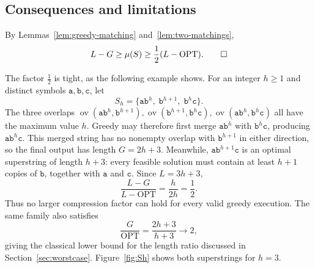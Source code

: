 \documentclass[11pt,a4paper]{article}   %
\makeatletter
\renewenvironment{proof}[1][\proofname]{\par
  \pushQED{\qed}%
  \normalfont \topsep1\p@\@plus1\p@\relax
  \trivlist
  \item[\hskip\labelsep\itshape #1\@addpunct{.}]\ignorespaces
}{\popQED\endtrivlist\@endpefalse}
\theoremstyle{compact}
\theoremstyle{compactdef}
\newcommand{\OPT}{\mathrm{OPT}}
\newcommand{\GR}{G}                         %
\newcommand{\ov}{\operatorname{ov}}         %
\newcommand{\str}[1]{\texttt{#1}}           %
\makeatother
\begin{document}
\subsection{Consequences and limitations}

\begin{proof}[Proof of Theorem~\ref{thm:half}]
By Lemmas~\ref{lem:greedy-matching} and~\ref{lem:two-matchings}, 
\[L-\GR\ge\mu(S)\ge\frac12(L-\OPT).\qedhere\]
\end{proof}


The factor $\frac12$ is tight, as the following example shows. For an integer $h\ge1$ and
distinct symbols $\str{a},\str{b},\str{c}$, let
\[
S_h=\{\str{a}\str{b}^h,\;\str{b}^{h+1},\;
       \str{b}^h\str{c}\}.
\]
The three overlaps $\ov(\str{a}\str{b}^h,\str{b}^{h+1}),
\ov(\str{b}^{h+1},\str{b}^h\str{c}),
\ov(\str{a}\str{b}^h,\str{b}^h\str{c})$
all have the maximum value $h$. Greedy may therefore first merge
$\str{a}\str{b}^h$ with $\str{b}^h\str{c}$, producing
$\str{a}\str{b}^h\str{c}$. This merged string has no nonempty
overlap with $\str{b}^{h+1}$ in either direction, so the final
output has length $\GR=2h+3$. Meanwhile, $\str{a}\str{b}^{h+1}\str{c}$ is an optimal
superstring of length $h+3$: every feasible solution must contain
at least $h+1$ copies of $\str{b}$, together with $\str{a}$ and
$\str{c}$. Since $L=3h+3$,
\[
\frac{L-\GR}{L-\OPT}=\frac{h}{2h}=\frac12.
\]
Thus no larger compression factor can hold for every valid greedy
execution. The same family also satisfies
\[
\frac{\GR}{\OPT}=\frac{2h+3}{h+3}\longrightarrow 2,
\]
giving the classical lower bound for the length ratio discussed
in Section~\ref{sec:worstcase}. Figure~\ref{fig:Sh} shows both
superstrings for $h=3$.
\end{document}
